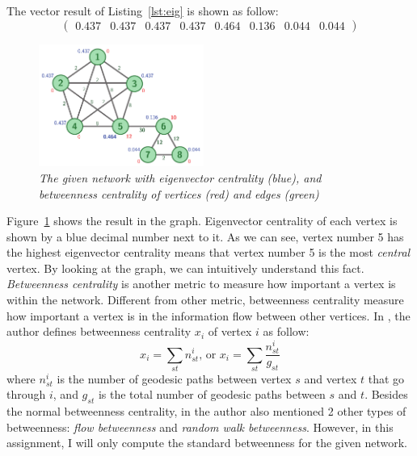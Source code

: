 \documentclass[a4paper,12pt]{article}
\begin{document}
\pagebreak

\noindent
The vector result of Listing~\ref{lst:eig} is shown as follow:
\[ \left( \begin{array}{cccccccc} 0.437 & 0.437 & 0.437 & 0.437 & 0.464 & 0.136 & 0.044 & 0.044 \end{array} \right) \]
\begin{figure}
    \vspace{-1em}
    \centering
      \includegraphics[width=0.48\textwidth]{cn_a2_eigbet}
    \caption{\emph{The given network with eigenvector centrality (blue), and betweenness centrality of vertices (red) and edges (green)}}
    \label{fig:eigbet}
    \vspace{-1em}
\end{figure}
\noindent
Figure~\ref{fig:eigbet} shows the result in the graph. Eigenvector centrality of each vertex is shown by a blue decimal number next to it. As we can see, vertex number 5 has the highest eigenvector centrality means that vertex number 5 is the most \emph{central} vertex. By looking at the graph, we can intuitively understand this fact.
\newline
\noindent
\emph{Betweenness centrality} is another metric to measure how important a vertex is within the network. Different from other metric, betweenness centrality measure how important a vertex is in the information flow between other vertices. In \cite{net}, the author defines betweenness centrality $x_i$ of vertex $i$ as follow:
$$ x_i = \displaystyle \sum_{st} n_{st}^i \mbox{, or } x_i = \displaystyle \sum_{st} \frac{n_{st}^i}{g_{st}} $$
where $n^i_{st}$ is the number of geodesic paths between vertex $s$ and vertex $t$ that go through $i$, and $g_{st}$ is the total number of geodesic paths between $s$ and $t$. Besides the normal betweenness centrality, in \cite{net} the author also mentioned 2 other types of betweenness: \emph{flow betweenness} and \emph{random walk betweenness}. However, in this assignment, I will only compute the standard betweenness for the given network.
\end{document}
